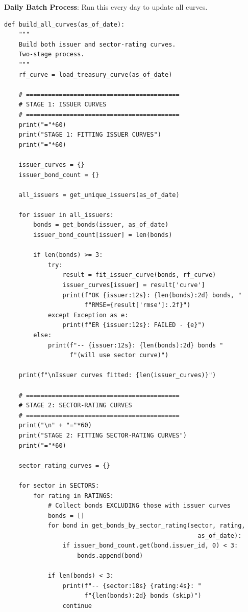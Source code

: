 \documentclass[11pt,a4paper]{article}
\begin{document}
\begin{implbox}
\textbf{Daily Batch Process}: Run this every day to update all curves.

\begin{lstlisting}
def build_all_curves(as_of_date):
    """
    Build both issuer and sector-rating curves.
    Two-stage process.
    """
    rf_curve = load_treasury_curve(as_of_date)
    
    # ==========================================
    # STAGE 1: ISSUER CURVES
    # ==========================================
    print("="*60)
    print("STAGE 1: FITTING ISSUER CURVES")
    print("="*60)
    
    issuer_curves = {}
    issuer_bond_count = {}
    
    all_issuers = get_unique_issuers(as_of_date)
    
    for issuer in all_issuers:
        bonds = get_bonds(issuer, as_of_date)
        issuer_bond_count[issuer] = len(bonds)
        
        if len(bonds) >= 3:
            try:
                result = fit_issuer_curve(bonds, rf_curve)
                issuer_curves[issuer] = result['curve']
                print(f"OK {issuer:12s}: {len(bonds):2d} bonds, "
                      f"RMSE={result['rmse']:.2f}")
            except Exception as e:
                print(f"ER {issuer:12s}: FAILED - {e}")
        else:
            print(f"-- {issuer:12s}: {len(bonds):2d} bonds "
                  f"(will use sector curve)")
    
    print(f"\nIssuer curves fitted: {len(issuer_curves)}")
    
    # ==========================================
    # STAGE 2: SECTOR-RATING CURVES
    # ==========================================
    print("\n" + "="*60)
    print("STAGE 2: FITTING SECTOR-RATING CURVES")
    print("="*60)
    
    sector_rating_curves = {}
    
    for sector in SECTORS:
        for rating in RATINGS:
            # Collect bonds EXCLUDING those with issuer curves
            bonds = []
            for bond in get_bonds_by_sector_rating(sector, rating, 
                                                     as_of_date):
                if issuer_bond_count.get(bond.issuer_id, 0) < 3:
                    bonds.append(bond)
            
            if len(bonds) < 3:
                print(f"-- {sector:18s} {rating:4s}: "
                      f"{len(bonds):2d} bonds (skip)")
                continue
            

\end{lstlisting}
\end{implbox}
\end{document}
